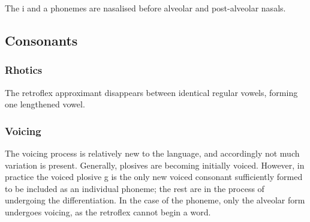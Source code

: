 \begin{quote}
\end{quote}

The i and a phonemes are nasalised before alveolar and post-alveolar nasals.

\begin{quote}
\begin{multicols}{2}
\phonc{i}{\textipa{\~i}}{\oneof{\phold \textipa{\|]{n}}\\ \phold
    \textipa{\textsubsquare{n}}}}

\phonc{a}{\textipa{\~a}}{\oneof{\phold \textipa{\|]{n}}\\ \phold
    \textipa{\textsubsquare{n}}}}
\end{multicols}
\end{quote}

\subsection{Consonants}

\subsubsection{Rhotics}

The retroflex approximant \textipa{\textturnrrtail} disappears between identical
regular vowels, forming one lengthened vowel.

\begin{quote}
\end{quote}

\subsubsection{Voicing}

The voicing process is relatively new to the language, and accordingly not much
variation is present. Generally, plosives are becoming initially voiced.
However, in practice the voiced plosive g is the only new voiced consonant
sufficiently formed to be included as an individual phoneme; the rest are in the
process of undergoing the differentiation. In the case of the \textipa{\|]{t}}
phoneme, only the alveolar form undergoes voicing, as the retroflex cannot begin
a word.


